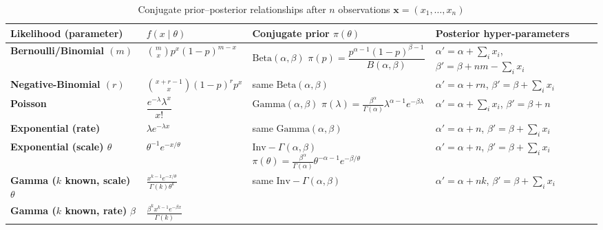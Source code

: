 \documentclass{article}
\begin{document}
\begin{table}[htbp]
\scriptsize
\centering
\setlength\tabcolsep{4pt}      %
\renewcommand{\arraystretch}{1} %
\caption{Conjugate prior–posterior relationships after $n$ observations $\mathbf x=(x_1,\dots,x_n)$}
\begin{adjustbox}{max width=\textwidth} %
\begin{tabular}{@{}p{3.0cm} p{3.2cm} p{4.3cm} p{4.1cm}@{}}
\toprule
\textbf{Likelihood (parameter)} &
\textbf{$f(x\mid\theta)$} &
\textbf{Conjugate prior $\pi(\theta)$} &
\textbf{Posterior hyper-parameters} \\ 
\midrule
\textbf{Bernoulli/Binomial $(m)$} &
$\displaystyle\binom{m}{x}p^{x}(1-p)^{m-x}$ &
\makecell[l]{$\mathrm{Beta}(\alpha,\beta)$\\[-2pt]
$\displaystyle
\pi(p)=\dfrac{p^{\alpha-1}(1-p)^{\beta-1}}{B(\alpha,\beta)}$} &
$\alpha'=\alpha+\sum_i x_i$,\;
$\beta'=\beta+n m-\sum_i x_i$ \\
\midrule
\textbf{Negative-Binomial $(r)$} &
$\displaystyle\binom{x+r-1}{x}(1-p)^r p^{x}$ &
same $\mathrm{Beta}(\alpha,\beta)$ &
$\alpha'=\alpha+r n$,\;
$\beta'=\beta+\sum_i x_i$ \\
\midrule
\textbf{Poisson} &
$\displaystyle \dfrac{e^{-\lambda}\lambda^{x}}{x!}$ &
\makecell[l]{$\mathrm{Gamma}(\alpha,\beta)$\\[-2pt]
$\displaystyle
\pi(\lambda)=\frac{\beta^{\alpha}}{\Gamma(\alpha)}
\lambda^{\alpha-1}e^{-\beta\lambda}$} &
$\alpha'=\alpha+\sum_i x_i$,\;
$\beta'=\beta+n$ \\
\midrule
\textbf{Exponential (rate)} &
$\lambda e^{-\lambda x}$ &
same $\mathrm{Gamma}(\alpha,\beta)$ &
$\alpha'=\alpha+n$,\;
$\beta'=\beta+\sum_i x_i$ \\
\midrule
\textbf{Exponential (scale) $\theta$} &
$\theta^{-1}e^{-x/\theta}$ &
\makecell[l]{$\mathrm{Inv}\!\!-\!\Gamma(\alpha,\beta)$\\[-2pt]
$\displaystyle
\pi(\theta)=\frac{\beta^{\alpha}}{\Gamma(\alpha)}
\theta^{-\alpha-1}e^{-\beta/\theta}$} &
$\alpha'=\alpha+n$,\;
$\beta'=\beta+\sum_i x_i$ \\
\midrule
\textbf{Gamma ($k$ known, scale)} $\theta$ &
$\displaystyle\frac{x^{k-1}e^{-x/\theta}}{\Gamma(k)\theta^{k}}$ &
same $\mathrm{Inv}\!\!-\!\Gamma(\alpha,\beta)$ &
$\alpha'=\alpha+n k$,\;
$\beta'=\beta+\sum_i x_i$ \\
\midrule
\textbf{Gamma ($k$ known, rate)} $\beta$ &
$\displaystyle\frac{\beta^{k}x^{k-1}e^{-\beta x}}{\Gamma(k)}$ &

\end{tabular}
\end{adjustbox}
\end{table}
\end{document}

